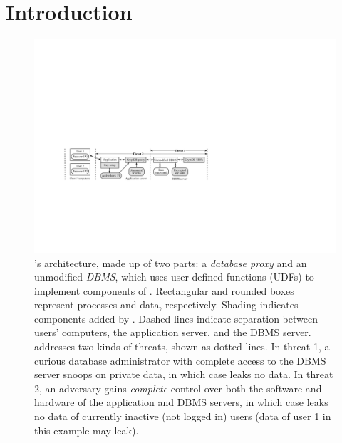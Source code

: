 
\section{Introduction}
\label{s:intro}

\begin{figure}
\centering
\includegraphics{fig/overview}
\caption{\name's architecture, made up of two parts: a {\em database
    proxy} and an unmodified {\em DBMS}, which uses
  user-defined functions (UDFs) to implement components of \name{}.
  Rectangular and rounded boxes represent processes and data,
  respectively.  Shading indicates components added by \name.  Dashed
  lines indicate separation between users' computers, the application
  server, and the DBMS server.  \name{} addresses two kinds of
  threats, shown as dotted lines.  In threat 1, a curious database
  administrator with complete access to the DBMS server snoops on
  private data, in which case \name{} leaks no data.  In threat 2, an
  adversary gains {\em complete} control over both the software and
  hardware of the application and DBMS servers, in which case
  \name{} leaks no data of currently inactive (not logged in) users
  (data of user 1 in this example may leak).}

\label{fig:overview}
\end{figure}


